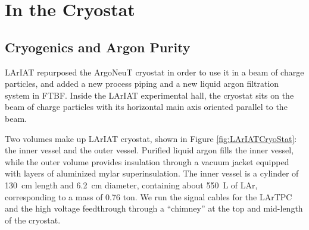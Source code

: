 \section{In the Cryostat}
\subsection{Cryogenics and Argon Purity}\label{ch:Cryo}
LArIAT repurposed the ArgoNeuT cryostat \cite{ArgoNeuT-det} in order to use it in a beam of charge particles, and added a new process piping and a new liquid argon filtration system in FTBF.  %
Inside the LArIAT experimental hall, the cryostat sits on the beam of charge particles with its horizontal main axis oriented parallel to the beam.

Two volumes make up LArIAT cryostat, shown in Figure \ref{fig:LArIATCryoStat}:  the inner vessel and the outer vessel. Purified liquid argon fills the inner vessel, while the outer volume provides insulation through a vacuum jacket equipped with layers of aluminized mylar superinsulation. The inner vessel is a cylinder of 130~cm length and 6.2~cm diameter, containing about 550~L of LAr, corresponding to a mass of 0.76 ton. We run the signal cables for the LArTPC and the high voltage feedthrough through a ``chimney'' at the top and mid-length of the cryostat.


